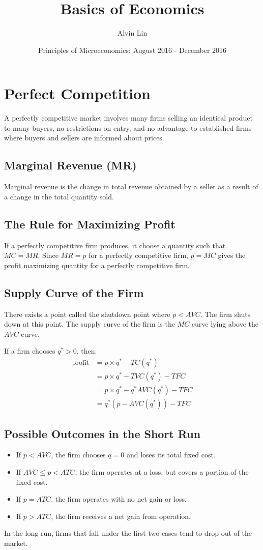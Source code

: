 \documentclass[letterpaper, 12pt]{article}
\title{Basics of Economics}
\author{Alvin Lin}
\date{Principles of Microeconomics: August 2016 - December 2016}
\begin{document}
\maketitle

\section{Perfect Competition}
A perfectly competitive market involves many firms selling an identical product
to many buyers, no restrictions on entry, and no advantage to established firms
where buyers and sellers are informed about prices.

\subsection{Marginal Revenue (MR)}
Marginal revenue is the change in total revenue obtained by a seller as a
result of a change in the total quantity sold.

\subsection{The Rule for Maximizing Profit}
If a perfectly competitive firm produces, it choose a quantity such that
\( MC = MR \). Since \( MR = p \) for a perfectly competitive firm,
\( p = MC \) gives the profit maximizing quantity for a perfectly competitive
firm.

\subsection{Supply Curve of the Firm}
There exists a point called the shutdown point where \( p < AVC \). The firm
shuts down at this point. The supply curve of the firm is the \( MC \) curve
lying above the \( AVC \) curve. \par
If a firm chooses \( q^{*} > 0 \), then:
\begin{align*}
  \mathrm{profit} &= p \times q^{*}-TC(q^{*}) \\
  &= p \times q^{*}-TVC(q^{*})-TFC \\
  &= p \times q^{*}-q^{*}AVC(q^{*})-TFC \\
  &= q^{*}(p-AVC(q^{*}))-TFC
\end{align*}

\subsection{Possible Outcomes in the Short Run}
\begin{itemize}
  \item If \( p < AVC \), the firm chooses \( q = 0 \) and loses its total
    fixed cost.
  \item If \( AVC \leq p < ATC \), the firm operates at a loss, but covers a
    portion of the fixed cost.
  \item If \( p = ATC \), the firm operates with no net gain or loss.
  \item If \( p > ATC \), the firm receives a net gain from operation.
\end{itemize}
In the long run, firms that fall under the first two cases tend to drop out of
the market.
\end{document}
